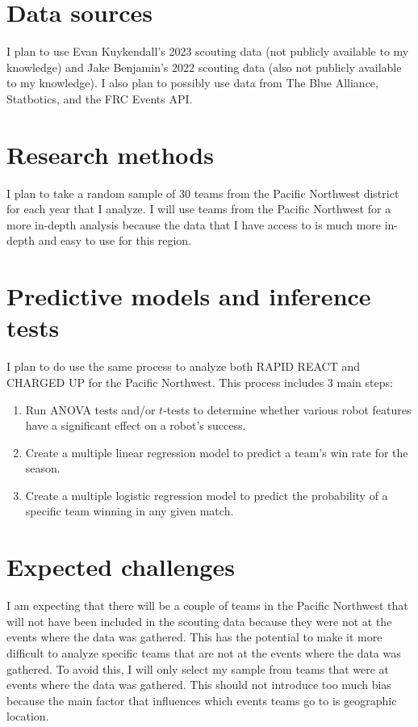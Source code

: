 \documentclass[12pt, letterpaper]{article}
\begin{document}
\section{Data sources}

I plan to use Evan Kuykendall's 2023 scouting data (not publicly available to my knowledge) and Jake Benjamin's 2022
scouting data (also not publicly available to my knowledge). I also plan to possibly use data from The Blue Alliance,
Statbotics, and the FRC Events API.\@ 

\section{Research methods}

I plan to take a random sample of 30 teams from the Pacific Northwest district for each year that I analyze. I will use
teams from the Pacific Northwest for a more in-depth analysis because the data that I have access to is much more
in-depth and easy to use for this region. 

\section{Predictive models and inference tests}

I plan to do use the same process to analyze both RAPID REACT and CHARGED UP for the Pacific Northwest. This process
includes 3 main steps:
\begin{enumerate}
    \item Run ANOVA tests and/or $t$-tests to determine whether various robot features have a significant effect on a
    robot's success.
    \item Create a multiple linear regression model to predict a team's win rate for the season.
    \item Create a multiple logistic regression model to predict the probability of a specific team winning in any 
    given match.
\end{enumerate}

\section{Expected challenges}

I am expecting that there will be a couple of teams in the Pacific Northwest that will not have been included in the
scouting data because they were not at the events where the data was gathered. This has the potential to make it more
difficult to analyze specific teams that are not at the events where the data was gathered. To avoid this, I will only
select my sample from teams that were at events where the data was gathered. This should not introduce too much bias
because the main factor that influences which events teams go to is geographic location. 
\end{document}
